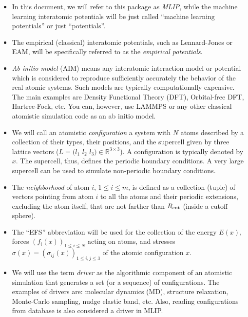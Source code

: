 \documentclass[12pt]{article}
\renewcommand{\_}{\char`_}
\begin{document}
\begin{itemize}
	\item In this document, we will refer to this package as \emph{MLIP}, while the machine learning interatomic potentials will be just called ``machine learning potentials'' or just ``potentials''. 
	
	\item The empirical (classical) interatomic potentials, such as Lennard-Jones or EAM, will be specifically referred to as the \emph{empirical potentials}.
	
	\item \emph{Ab initio model} (AIM) means any interatomic interaction model or potential which is considered to reproduce sufficiently accurately the behavior of the real atomic systems. Such models are typically computationally expensive. The main examples are Density Functional Theory (DFT), Orbital-free DFT, Hartree-Fock, etc.
	You can, however, use LAMMPS or any other classical atomistic simulation code as an ab initio model.
	
	\item We will call an atomistic \emph{configuration} a system with $N$ atoms described by a collection of their types, their positions, and the supercell given by three lattice vectors ($L = \big(l_1 \,\, l_2 \,\, l_3\big)\in{\mathbb R}^{3\times 3}$).
	A configuration is typically denoted by $x$.
	The supercell, thus, defines the periodic boundary conditions.
	A very large supercell can be used to simulate non-periodic boundary conditions.
	
	\item The \emph{neighborhood} of atom $i$, $1\leq i\leq m$, is defined as a collection (tuple) of vectors pointing from atom $i$ to all the atoms and their periodic extensions, excluding the atom itself, that are not farther than $R_{\rm cut}$ (inside a cutoff sphere).
	
	\item The ``EFS'' abbreviation will be used for the collection of the energy $E(x)$, forces $(f_i(x))_{1\leq i\leq N}$ acting on atoms, and stresses $\sigma(x)=(\sigma_{ij}(x))_{1\leq i,j\leq 3}$ of the atomic configuration $x$.
	
	\item We will use the term \emph{driver} as the algorithmic component of an atomistic simulation that generates a set (or a sequence) of configurations.
	The examples of drivers are: molecular dynamics (MD), structure relaxation, Monte-Carlo sampling, nudge elastic band, etc.
	Also, reading configurations from database is also considered a driver in MLIP.
\end{itemize}
\end{document}
